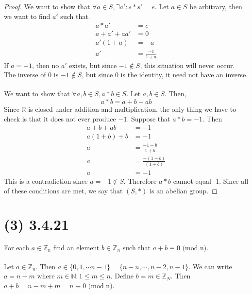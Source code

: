 \documentclass{article}
\begin{document}
\begin{proof}
    We want to show that $\forall a \in S, \exists a' : s * s' = e$.
    Let $a \in S$ be arbitrary, then we want to find $a'$ such that.
    \begin{align*}
        a * a' & = e \\
        a + a' + aa' & = 0 \\
        a'(1 + a) & = -a \\
        a' & = \frac{-1}{1+a}
    \end{align*}
    If $a = -1$, then no $a'$ exists, but since $-1 \notin S$, this situation will never occur.
    The inverse of 0 is $-1 \notin S$, but since 0 is the identity, it need not have an inverse.
    \\\\
    We want to show that $\forall a,b \in S, a * b \in S$.
    Let $a,b \in S$. Then,
    \[ a * b = a + b + ab \]
    Since $\mathbb{R}$ is closed under addition and multiplication, the only thing we have to check is that it does not ever produce $-1$.
    Suppose that $a * b = -1$.
    Then
    \begin{align*}
        a + b + ab & = -1 \\
        a(1 + b) + b & = -1 \\
        a & = \frac{-1-b}{1+b} \\
        a & = \frac{-(1+b)}{(1+b)} \\
        a & = -1
    \end{align*}
    This is a contradiction since $a = -1 \notin S$.
    Therefore $a * b$ cannot equal -1.
    Since all of these conditions are met, we say that $(S, *)$ is an abelian group.
\end{proof}
\section*{(3) 3.4.21}
For each $a \in \mathbb{Z}_n$ find an element $b \in \mathbb{Z}_n$ such that $a + b \equiv 0 \text{  (mod n)}$.
\\\\
Let $a \in \mathbb{Z}_n$. Then $a \in \{ 0, 1, \cdots n-1 \} = \{ n - n, \cdots, n-2, n-1\}$.
We can write $a = n - m$ where $m \in \mathbb{N} : 1 \leqslant m \leqslant n$.
Define $b = m \in \mathbb{Z}_N$.
Then $a + b = n - m + m = n \equiv 0 \text { (mod n)}$.
\end{document}
